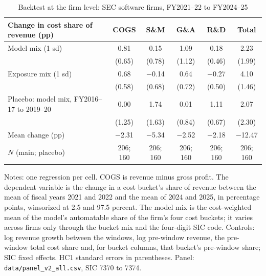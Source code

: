 \begin{table}[tbp]
\centering
\caption{Backtest at the firm level: SEC software firms, FY2021--22 to FY2024--25}\label{tab:backtest-firm}
\small
\begin{tabular}{@{}lccccc@{}}
\toprule
Change in cost share of revenue (pp) & COGS & S\&M & G\&A & R\&D & Total\\
\midrule
Model mix (1 sd) & 0.81 & 0.15 & 1.09 & 0.18 & 2.23\\
 & (0.65) & (0.78) & (1.12) & (0.46) & (1.99)\\
Exposure mix (1 sd) & 0.68 & $-$0.14 & 0.64 & $-$0.27 & 4.10\\
 & (0.58) & (0.68) & (0.72) & (0.50) & (1.46)\\
Placebo: model mix, FY2016--17 to 2019--20 & 0.00 & 1.74 & 0.01 & 1.11 & 2.07\\
 & (1.25) & (1.63) & (0.84) & (0.67) & (2.30)\\
\addlinespace
Mean change (pp) & $-$2.31 & $-$5.34 & $-$2.52 & $-$2.18 & $-$12.47\\
$N$ (main; placebo) & 206; 160 & 206; 160 & 206; 160 & 206; 160 & 206; 160\\
\bottomrule
\end{tabular}
\smallskip
\begin{minipage}{0.97\linewidth}\footnotesize
Notes: one regression per cell. COGS is revenue minus gross profit. The dependent variable is the change in a cost bucket's share of revenue between the mean of fiscal years 2021 and 2022 and the mean of 2024 and 2025, in percentage points, winsorized at 2.5 and 97.5 percent. The model mix is the cost-weighted mean of the model's automatable share of the firm's four cost buckets; it varies across firms only through the bucket mix and the four-digit SIC code. Controls: log revenue growth between the windows, log pre-window revenue, the pre-window total cost share and, for bucket columns, that bucket's pre-window share; SIC fixed effects. HC1 standard errors in parentheses. Panel: \texttt{data/panel\_v2\_all.csv}, SIC 7370 to 7374.
\end{minipage}
\end{table}

